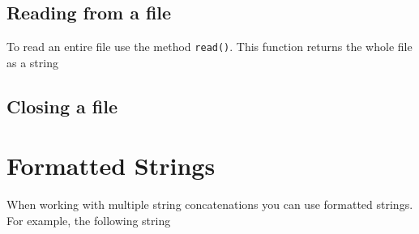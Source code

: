 \begin{Shaded}
\begin{Highlighting}[]
\NormalTok{)}
\end{Highlighting}
\end{Shaded}

\subsection{Reading from a
file}\label{python-introduction.md__reading-from-a-file}

To read an entire file use the method \texttt{read()}. This function
returns the whole file as a string

\begin{Shaded}
\begin{Highlighting}[]
\end{Highlighting}
\end{Shaded}

\subsection{Closing a
file}\label{python-introduction.md__closing-a-file}

\begin{Shaded}
\begin{Highlighting}[]
\end{Highlighting}
\end{Shaded}

\section{Formatted
Strings}\label{python-introduction.md__formatted-strings}

When working with multiple string concatenations you can use formatted
strings. For example, the following string

\begin{Shaded}
\begin{Highlighting}[]
\OperatorTok{=} 
\OperatorTok{=} 
\OperatorTok{=} 
\OperatorTok{=} 
\OperatorTok{=} 

\OperatorTok{=}\OperatorTok{+}  \OperatorTok{+}\OperatorTok{+}  \OperatorTok{+}\OperatorTok{+}  \OperatorTok{+}\OperatorTok{+}  \OperatorTok{+} 
\end{Highlighting}
\end{Shaded}

